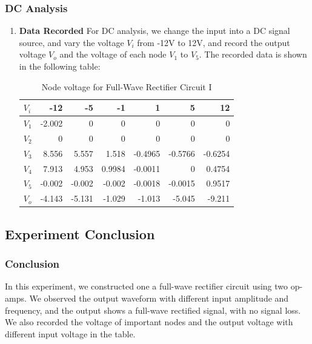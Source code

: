     \subsubsection{DC Analysis}
    \begin{enumerate}[I]
        \item \textbf{Data Recorded}\newline
            For DC analysis, we change the input into a DC signal source, and vary the voltage $V_i$ from -12V to 12V, and record the output voltage $V_o$ and the voltage of each node $V_1$ to $V_5$. The recorded data is shown in the following table:
            \begin{table}[H]
                \centering
                \begin{tabular}{l|rrrrrr}
                    \toprule
                    $V_i$   & -12   & -5    & -1    & 1     & 5     & 12 \\
                    \midrule
                    $V_1$   & -2.002 & 0     & 0     & 0     & 0     & 0 \\
                    $V_2$   & 0     & 0     & 0     & 0     & 0     & 0 \\
                    $V_3$   & 8.556 & 5.557 & 1.518 & -0.4965 & -0.5766 & -0.6254 \\
                    $V_4$   & 7.913 & 4.953 & 0.9984 & -0.0011 & 0     & 0.4754 \\
                    $V_5$   & -0.002 & -0.002 & -0.002 & -0.0018 & -0.0015 & 0.9517 \\
                    $V_o$   & -4.143 & -5.131 & -1.029 & -1.013 & -5.045 & -9.211 \\
                    \bottomrule
                    \end{tabular}%
                \caption{Node voltage for Full-Wave Rectifier Circuit I}
                \label{tab:}
            \end{table}
    \end{enumerate}
    
\subsection{Experiment Conclusion}
    \subsubsection{Conclusion}
    In this experiment, we constructed one a full-wave rectifier circuit using two op-amps. We observed the output waveform with different input amplitude and frequency, and the output shows a full-wave rectified signal, with no signal loss. We also recorded the voltage of important nodes and the output voltage with different input voltage in the table.